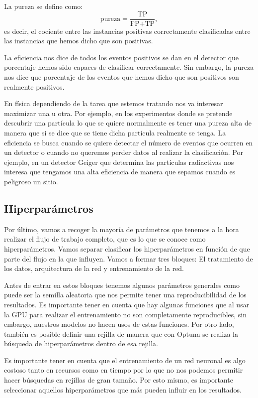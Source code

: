 \documentclass[a4paper,12pt,twoside,titlepage]{article}
\begin{document}
La pureza se define como:
\begin{equation}
  \text{pureza} = \frac{\text{TP}}{\text{FP} + \text{TP}},
\end{equation}
es decir, el cociente entre las instancias positivas correctamente clasificadas entre las instancias que hemos dicho que son positivas. 

La eficiencia nos dice de todos los eventos positivos se dan en el detector que porcentaje hemos sido capaces de clasificar correctamente. Sin embargo, la pureza nos dice que porcentaje de los eventos que hemos dicho que son positivos son realmente positivos.

En física dependiendo de la tarea que estemos tratando nos va interesar maximizar una u otra. Por ejemplo, en los experimentos donde se pretende descubrir una partícula lo que se quiere normalmente es tener una pureza alta de manera que si se dice que se tiene dicha partícula realmente se tenga. La eficiencia se busca cuando se quiere detectar el número de eventos que ocurren en un detector o cuando no queremos perder datos al realizar la clasificación. Por ejemplo, en un detector Geiger que determina las partículas radiactivas nos interesa que tengamos una alta eficiencia de manera que sepamos cuando es peligroso un sitio.   

\subsection{Hiperparámetros}

Por último, vamos a recoger la mayoría de parámetros que tenemos a la hora realizar el flujo de trabajo completo, que es lo que se conoce como hiperparámetros. Vamos separar clasificar los hiperparámetros en función de que parte del flujo en la que influyen. Vamos a formar tres bloques: El tratamiento de los datos, arquitectura de la red y entrenamiento de la red.

Antes de entrar en estos bloques tenemos algunos parámetros generales como puede ser la semilla aleatoria que nos permite tener una reproducibilidad de los resultados. Es importante tener en cuenta que hay algunas funciones que al usar la GPU para realizar el entrenamiento no son completamente reproducibles, sin embargo, nuestros modelos no hacen usos de estas funciones. Por otro lado, también es posible definir una rejilla de manera que con Optuna se realiza la búsqueda de hiperparámetros dentro de esa rejilla.

Es importante tener en cuenta que el entrenamiento de un red neuronal es algo costoso tanto en recursos como en tiempo por lo que no nos podemos permitir hacer búsquedas en rejillas de gran tamaño. Por esto mismo, es importante seleccionar aquellos hiperparámetros que más pueden influir en los resultados.
\end{document}
